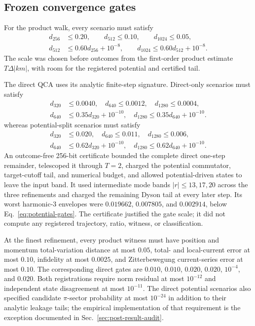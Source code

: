 \subsection{Frozen convergence gates}

For the product walk, every scenario must satisfy
\begin{equation}
 \begin{aligned}
 d_{256}&\le0.20,\qquad d_{512}\le0.10,\qquad d_{1024}\le0.05,\\
 d_{512}&\le0.60d_{256}+10^{-8},\qquad
 d_{1024}\le0.60d_{512}+10^{-8}.
 \end{aligned}
 \label{eq:product-absolute-gates}
\end{equation}
The scale was chosen before outcomes from the
first-order product estimate $T\Delta |km|$, with room for the registered
potential and certified tail.

The direct QCA uses its analytic finite-step signature.  Direct-only scenarios
must satisfy
\begin{equation}
 \begin{aligned}
 d_{320}&\le0.0040,\quad d_{640}\le0.0012,\quad d_{1280}\le0.0004,\\
 d_{640}&\le0.35d_{320}+10^{-10},\quad
 d_{1280}\le0.35d_{640}+10^{-10}.
 \end{aligned}
 \label{eq:direct-gates}
\end{equation}
whereas potential-split scenarios must satisfy
\begin{equation}
 \begin{aligned}
 d_{320}&\le0.020,\quad d_{640}\le0.011,\quad d_{1280}\le0.006,\\
 d_{640}&\le0.62d_{320}+10^{-10},\quad
 d_{1280}\le0.62d_{640}+10^{-10}.
 \end{aligned}
 \label{eq:potential-gates}
\end{equation}
An outcome-free 256-bit certificate bounded the complete direct one-step
remainder, telescoped it through $T=2$, charged the potential commutator,
target-cutoff tail, and numerical budget, and allowed potential-driven states
to leave the input band.  It used intermediate mode bands
$|r|\le13,17,20$ across the three refinements and charged the remaining Dyson
tail at every later step.  Its worst harmonic-$3$ envelopes were
$0.019662$, $0.007805$, and $0.002914$, below
Eq.~\eqref{eq:potential-gates}.  The certificate justified the gate scale; it did
not compute any registered trajectory, ratio, witness, or classification.

At the finest refinement, every product witness must have position and
momentum total-variation distance at most $0.05$, total- and local-current
error at most $0.10$, infidelity at most $0.0025$, and Zitterbewegung
current-series error at most $0.10$.  The corresponding direct gates are
$0.010$, $0.010$, $0.020$, $0.020$, $10^{-4}$, and $0.020$.
Both registrations require norm residual at most $10^{-12}$ and independent
state disagreement at most $10^{-11}$.  The direct potential scenarios also
specified candidate $\pi$-sector probability at most $10^{-24}$ in addition
to their analytic leakage tails; the empirical implementation of that
requirement is the exception documented in
Sec.~\ref{sec:post-result-audit}.

